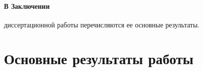 \documentclass[14pt,autoref,href
,facsimile
]{disser}
\begin{document}
\paragraph{В Заключении} диссертационной работы перечисляются ее основные результаты.


\section*{Основные результаты работы}
\Results


\renewcommand\bibsection{\section*{Публикации по теме диссертации}}


\end{document}
